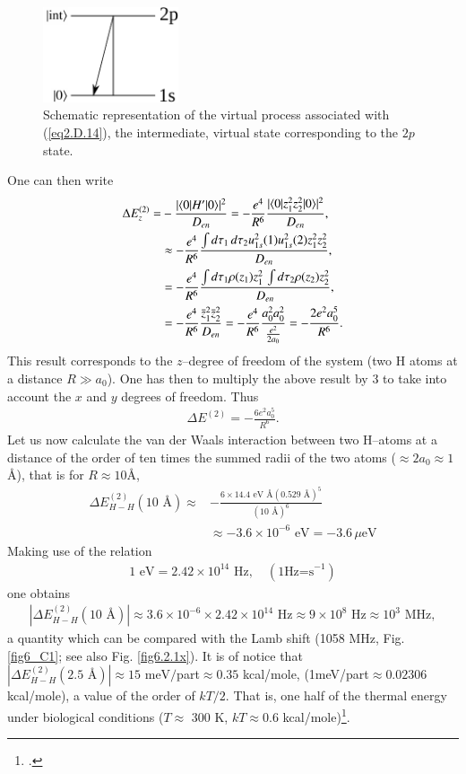 \begin{subappendices}
        \begin{figure}[h]
         \centerline{\includegraphics*[width=4cm,angle=0]{nutshell/figs/fig2D5_v2.pdf}}
         \caption{Schematic representation of the virtual process associated with (\ref{eq2.D.14}), the intermediate, virtual state corresponding to the $2p$ state.}\label{fig2.D.5}
         \end{figure}
  One can then write
  \begin{align}\label{eq2.D.17}
  \nonumber \Delta E_z^{(2)}=&-\frac{|\langle {0|H'|0} \rangle|^2}{D_{en}}=-\frac{e^4}{R^6}\frac{|\langle {0|z_1^2z_2^2|0} \rangle|^2}{D_{en}},\\
\nonumber  &\approx-\frac{e^4}{R^6}\frac{\int d\tau_1\,d\tau_2u^2_{1s}(1)u^2_{1s}(2)z_1^2z_2^2}{D_{en}},\\
\nonumber  &=-\frac{e^4}{R^6}\frac{\int d\tau_1\rho(z_1)z_1^2\,\int d\tau_2\rho(z_2)z_2^2}{D_{en}},\\
&=-\frac{e^4}{R^6}\frac{\bar z_1^2 \bar z_2^2}{D_{en}}=-\frac{e^4}{R^6}\frac{a_0^2a_0^2}{\frac{e^2}{2a_0}}=-\frac{2e^2a_0^5}{R^6}.  
   \end{align} 
This result corresponds to the $z$--degree of freedom of the system (two H atoms at a distance $R\gg a_0$). One has then to multiply the above result by 3 to take into account the $x$ and $y$ degrees of freedom. Thus   
   \begin{align}\label{eq2.D.18}
\Delta E^{(2)}=-\frac{6e^2a_0^5}{R^6}.
 \end{align}
Let us now calculate the van der Waals interaction between two H--atoms at a distance of the order of ten times the summed radii of the two atoms ($\approx2a_0\approx1$\AA), that is for $R\approx10$\AA, 
  \begin{align}\label{eq2.D.19}
  \nonumber \Delta E_{H-H}^{(2)}(10\text{ \AA})\approx&-\frac{6\times14.4\text{ eV \AA}(0.529\text{ \AA})^5}{(10\text{ \AA})^6}\\
  &\approx-3.6\times10^{-6}\text{ eV}=-3.6\,\mu\text{eV}  
   \end{align}  
Making use of the relation
\begin{align}\label{eq2.D.20}
1\text{ eV}=2.42\times 10^{14}\text{ Hz},\quad(1\text{Hz=s}^{-1})  
   \end{align}  
 one obtains
\begin{align}\label{eq2.D.21}
|\Delta E_{H-H}^{(2)}(10\text{ \AA})|\approx3.6\times 10^{-6}\times 2.42\times 10^{14}\text{ Hz}\approx9\times10^8\text{ Hz}\approx10^3\text{ MHz},      
\end{align} 
 a quantity which can be compared with the Lamb shift (1058 MHz, Fig. \ref{fig6_C1}; see also Fig. \ref{fig6.2.1x}). It is of notice that $|\Delta E_{H-H}^{(2)}(2.5\text{ \AA})|\approx15\text{ meV}/$part$\approx0.35$ kcal/mole, (1meV/part$\approx0.02306$ kcal/mole), a value of the order of $kT/2$. That is, one half of the thermal energy under biological conditions ($T\approx$ 300 K, $kT\approx 0.6$ kcal/mole)\footnote{\cite{Huang:05}.}.

\end{subappendices}
